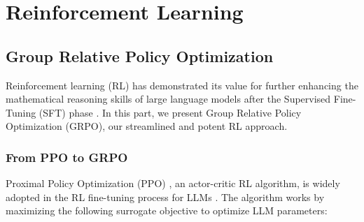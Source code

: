 \section{Reinforcement Learning}

\subsection{Group Relative Policy Optimization} Reinforcement learning (RL) has demonstrated its value for further enhancing the mathematical reasoning skills of large language models after the Supervised Fine-Tuning (SFT) phase \citep{wang2023math,wizardmath}. In this part, we present Group Relative Policy Optimization (GRPO), our streamlined and potent RL approach.

\subsubsection{From PPO to GRPO} Proximal Policy Optimization (PPO) \citep{schulman2017proximal}, an actor-critic RL algorithm, is widely adopted in the RL fine-tuning process for LLMs \citep{ouyang2022training}. The algorithm works by maximizing the following surrogate objective to optimize LLM parameters:

